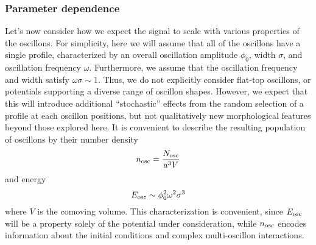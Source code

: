 \documentclass{revtex4}
\begin{document}
\subsubsection{Parameter dependence}
Let's now consider how we expect the signal to scale with various properties of the oscillons.
For simplicity, here we will assume that all of the oscillons have a single profile, characterized by an overall oscillation amplitude $\phi_0$, width $\sigma$, and oscillation frequency $\omega$.
Furthermore, we assume that the oscillation frequency and width satisfy $\omega\sigma \sim 1$.
Thus, we do not explicitly consider flat-top oscillons, or potentials supporting a diverse range of oscillon shapes.
However, we expect that this will introduce additional ``stochastic'' effects from the random selection of a profile at each oscillon positions, but not qualitatively new morphological features beyond those explored here. 
It is convenient to describe the resulting population of oscillons by their number density
\begin{equation}
  n_{\rm osc} = \frac{N_{\rm osc}}{a^3V}
\end{equation}
and energy
\begin{equation}
  E_{\rm osc} \sim \phi_0^2\omega^2\sigma^3
\end{equation}
where $V$ is the comoving volume.
This characterization is convenient, since $E_{\rm osc}$ will be a property solely of the potential under consideration, while $n_{\rm osc}$ encodes information about the initial conditions and complex multi-oscillon interactions.
\end{document}
